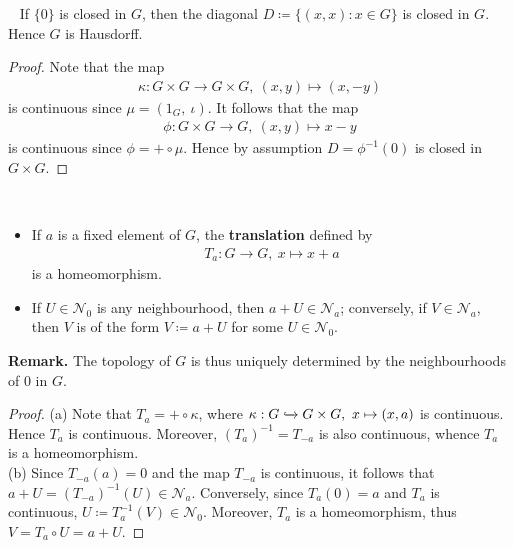 \documentclass[12pt,a4paper,footinclude=true,headinclude=true]{scrbook} %
\newenvironment{proposition}[2][]
{\renewcommand\theinnercustomprop{#2}\innercustomprop[#1] 
\begin{mdframed}[backgroundcolor=gray!20]\ }
{\end{mdframed}\endinnercustomprop}
\newenvironment{lemma}[2][]
{\renewcommand\theinnercustomlemma{#2}\innercustomlemma[#1]
\begin{mdframed}[backgroundcolor=gray!20]\ }
{\end{mdframed}\endinnercustomprop}
\begin{document}
\begin{lemma}{3}
    If $\{0\}$ is closed in $G$, then the diagonal $D\coloneqq\{(x,x):x\in G\}$ is closed in $G$. Hence $G$ is Hausdorff.
\end{lemma}
\begin{proof}
    Note that the map 
    \begin{align*}
        \kappa:G\times G\longrightarrow G\times G,\ (x,y)\longmapsto(x,-y)
    \end{align*}
    is continuous since $\mu=(1_G,\ \iota)$. It follows that the map 
    \begin{align*}
        \phi:G\times G\longrightarrow G,\ (x,y)\longmapsto x-y
    \end{align*}
    is continuous since $\phi=+\circ\mu$. Hence by assumption $D=\phi^{-1}(0)$ is closed in $G\times G$. 
\end{proof}
\newpage
\begin{proposition}{4}
    \begin{itemize}
        \item[(a)] If $a$ is a fixed element of $G$, the \textbf{translation} defined by 
        \begin{align*}
            T_a:G\longrightarrow G,\ x\longmapsto x+a
        \end{align*}
        is a homeomorphism.
        \item[(b)] If $U\in\mathcal{N}_0$ is any neighbourhood, then $a+U\in\mathcal{N}_a$; conversely, if $V\in\mathcal{N}_a$, then $V$ is of the form $V\coloneqq a+U$ for some $U\in\mathcal{N}_0$.
    \end{itemize}
    \textbf{Remark.} The topology of $G$ is thus uniquely determined by the neighbourhoods of $0$ in $G$.
\end{proposition}
\begin{proof}
    (a) Note that $T_a=+\circ\kappa$, where $\kappa:G\xhookrightarrow{} G\times G,\ x\mapsto(x,a)$ is continuous. Hence $T_a$ is continuous. Moreover,  $(T_a)^{-1}=T_{-a}$ is also continuous, whence $T_a$ is a homeomorphism.\\
    (b) Since $T_{-a}(a)=0$ and the map $T_{-a}$ is continuous, it follows that $a+U=(T_{-a})^{-1}(U)\in\mathcal{N}_a$. Conversely, since $T_a(0)=a$ and $T_a$ is continuous, $U\coloneqq T_a^{-1}(V)\in\mathcal{N}_0$. Moreover, $T_a$ is a homeomorphism, thus $V=T_a\circ U=a+U$.
\end{proof}
\end{document}
